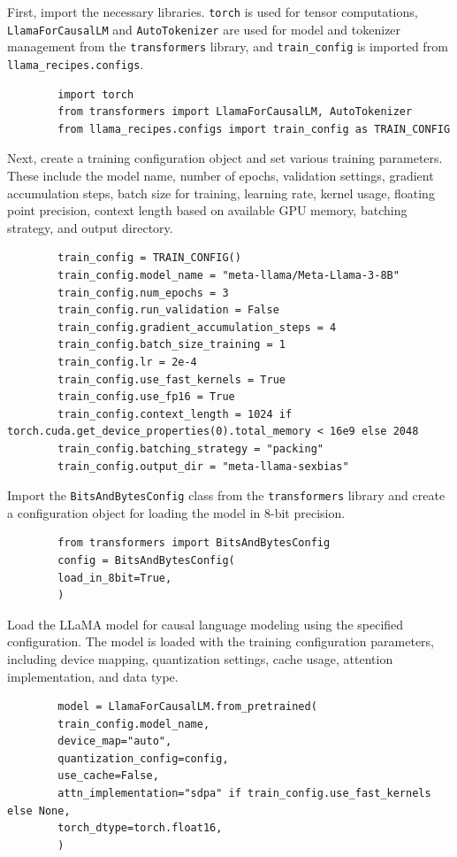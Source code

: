 \documentclass{solutionclass} %
\begin{document}
\begin{solution}
	First, import the necessary libraries. \texttt{torch} is used for tensor computations, \texttt{LlamaForCausalLM} and \texttt{AutoTokenizer} are used for model and tokenizer management from the \texttt{transformers} library, and \texttt{train\_config} is imported from \texttt{llama\_recipes.configs}.
	\begin{lstlisting}
		import torch
		from transformers import LlamaForCausalLM, AutoTokenizer
		from llama_recipes.configs import train_config as TRAIN_CONFIG
	\end{lstlisting}
\end{solution}

\begin{solution}
	Next, create a training configuration object and set various training parameters. These include the model name, number of epochs, validation settings, gradient accumulation steps, batch size for training, learning rate, kernel usage, floating point precision, context length based on available GPU memory, batching strategy, and output directory.
	\begin{lstlisting}
		train_config = TRAIN_CONFIG()
		train_config.model_name = "meta-llama/Meta-Llama-3-8B"
		train_config.num_epochs = 3
		train_config.run_validation = False
		train_config.gradient_accumulation_steps = 4
		train_config.batch_size_training = 1
		train_config.lr = 2e-4
		train_config.use_fast_kernels = True
		train_config.use_fp16 = True
		train_config.context_length = 1024 if torch.cuda.get_device_properties(0).total_memory < 16e9 else 2048
		train_config.batching_strategy = "packing"
		train_config.output_dir = "meta-llama-sexbias"
	\end{lstlisting}
\end{solution}

\begin{solution}
	Import the \texttt{BitsAndBytesConfig} class from the \texttt{transformers} library and create a configuration object for loading the model in 8-bit precision.
	\begin{lstlisting}
		from transformers import BitsAndBytesConfig
		config = BitsAndBytesConfig(
		load_in_8bit=True,
		)
	\end{lstlisting}
\end{solution}

\begin{solution}
	Load the LLaMA model for causal language modeling using the specified configuration. The model is loaded with the training configuration parameters, including device mapping, quantization settings, cache usage, attention implementation, and data type.
	\begin{lstlisting}
		model = LlamaForCausalLM.from_pretrained(
		train_config.model_name,
		device_map="auto",
		quantization_config=config,
		use_cache=False,
		attn_implementation="sdpa" if train_config.use_fast_kernels else None,
		torch_dtype=torch.float16,
		)
	\end{lstlisting}
\end{solution}
\end{document}
